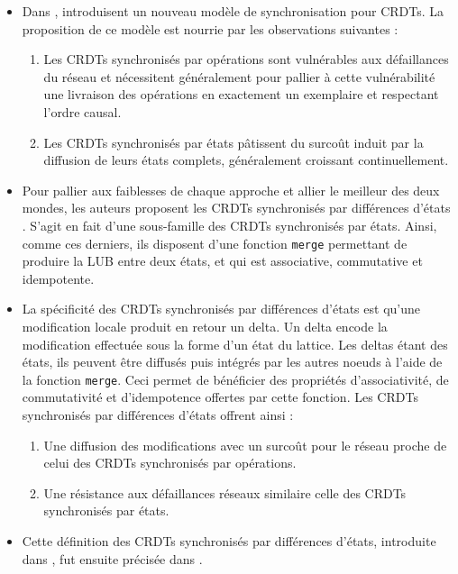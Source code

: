 \documentclass[12pt]{thesul}
\begin{document}
\begin{itemize}
  \item Dans \cite{almeida2015delta}, \citeauthor{almeida2015delta} introduisent un nouveau modèle de synchronisation pour \acp{CRDT}.
    La proposition de ce modèle est nourrie par les observations suivantes :
    \begin{enumerate}[label=(\roman*)]
      \item Les \acp{CRDT} synchronisés par opérations sont vulnérables aux défaillances du réseau et nécessitent généralement pour pallier à cette vulnérabilité une livraison des opérations en exactement un exemplaire et respectant l'ordre causal.
      \item Les \acp{CRDT} synchronisés par états pâtissent du surcoût induit par la diffusion de leurs états complets, généralement croissant continuellement.
    \end{enumerate}
  \item Pour pallier aux faiblesses de chaque approche et allier le meilleur des deux mondes, les auteurs proposent les \acp{CRDT} synchronisés par différences d'états \cite{almeida2015delta,Almeida_2018, enes2019}.
    S'agit en fait d'une sous-famille des \acp{CRDT} synchronisés par états.
    Ainsi, comme ces derniers, ils disposent d'une fonction \texttt{merge} permettant de produire la LUB entre deux états, et qui est associative, commutative et idempotente.
  \item La spécificité des \acp{CRDT} synchronisés par différences d'états est qu'une modification locale produit en retour un delta.
    Un delta encode la modification effectuée sous la forme d'un état du lattice.
    Les deltas étant des états, ils peuvent être diffusés puis intégrés par les autres noeuds à l'aide de la fonction \texttt{merge}.
    Ceci permet de bénéficier des propriétés d'associativité, de commutativité et d'idempotence offertes par cette fonction.
    Les \acp{CRDT} synchronisés par différences d'états offrent ainsi :
    \begin{enumerate}[label=(\roman*)]
      \item Une diffusion des modifications avec un surcoût pour le réseau proche de celui des \acp{CRDT} synchronisés par opérations.
      \item Une résistance aux défaillances réseaux similaire celle des \acp{CRDT} synchronisés par états.
    \end{enumerate}
  \item Cette définition des \acp{CRDT} synchronisés par différences d'états, introduite dans \cite{almeida2015delta,Almeida_2018}, fut ensuite précisée dans \cite{enes2019}.

\end{itemize}
\end{document}
